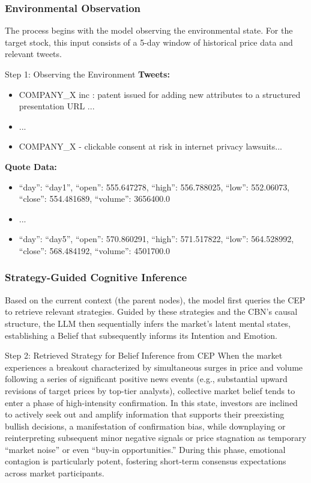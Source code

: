 \documentclass[letterpaper]{article} %
\begin{document}
\subsubsection{Environmental Observation}
The process begins with the model observing the environmental state. For the target stock, this input consists of a 5-day window of historical price data and relevant tweets.
\begin{forwardAuxBox}{Step 1: Observing the Environment}
    \textbf{Tweets:}
    \begin{itemize}
        \item COMPANY\_X inc : patent issued for adding new attributes to a structured presentation URL ...
        \item ...
        \item COMPANY\_X - clickable consent at risk in internet privacy lawsuits...
    \end{itemize}
    \textbf{Quote Data:}
    \begin{itemize}
        \item ``day'': ``day1'', ``open'': 555.647278, ``high'': 556.788025, ``low'': 552.06073, ``close'': 554.481689, ``volume'': 3656400.0
        \item ...
        \item ``day'': ``day5'', ``open'': 570.860291, ``high'': 571.517822, ``low'': 564.528992, ``close'': 568.484192, ``volume'': 4501700.0
    \end{itemize}
\end{forwardAuxBox}

\subsubsection{Strategy-Guided Cognitive Inference}
Based on the current context (the parent nodes), the model first queries the CEP to retrieve relevant strategies. Guided by these strategies and the CBN's causal structure, the LLM then sequentially infers the market's latent mental states, establishing a Belief that subsequently informs its Intention and Emotion.
\begin{forwardAuxBox}{Step 2: Retrieved Strategy for Belief Inference from CEP}
    When the market experiences a breakout characterized by simultaneous surges in price and volume following a series of significant positive news events (e.g., substantial upward revisions of target prices by top-tier analysts), collective market belief tends to enter a phase of high-intensity confirmation. In this state, investors are inclined to actively seek out and amplify information that supports their preexisting bullish decisions, a manifestation of confirmation bias, while downplaying or reinterpreting subsequent minor negative signals or price stagnation as temporary ``market noise'' or even ``buy-in opportunities.'' During this phase, emotional contagion is particularly potent, fostering short-term consensus expectations across market participants.
\end{forwardAuxBox}
\end{document}

